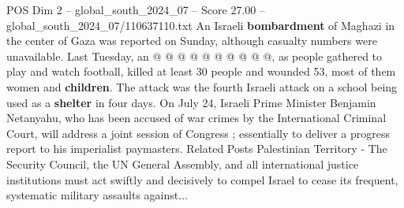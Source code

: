 \begin{textsample}{POS Dim 2 – global\_south\_2024\_07 – Score 27.00 – global\_south\_2024\_07/110637110.txt}
An Israeli \textbf{bombardment} of Maghazi in the center of Gaza was reported on Sunday, although casualty numbers were unavailable.
Last Tuesday, an @ @ @ @ @ @ @ @ @ @, as people gathered to play and watch football, killed at least 30 people and wounded 53, most of them women and \textbf{children}.
The attack was the fourth Israeli attack on a school being used as a \textbf{shelter} in four days.
On July 24, Israeli Prime Minister Benjamin Netanyahu, who has been accused of war crimes by the International Criminal Court, will address a joint session of Congress ; essentially to deliver a progress report to his imperialist paymasters.
Related Posts Palestinian Territory - The Security Council, the UN General Assembly, and all international justice institutions must act swiftly and decisively to compel Israel to cease its frequent, systematic military assaults against...

\end{textsample}
